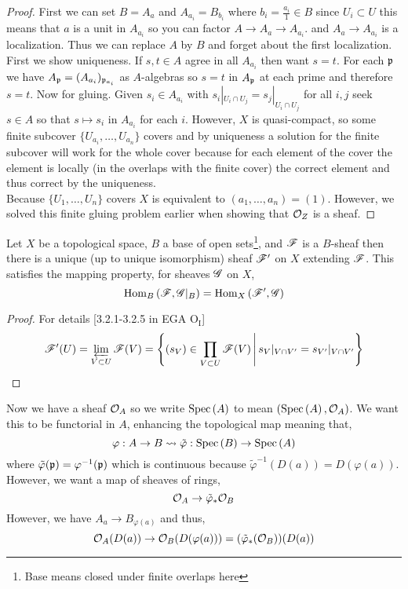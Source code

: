 \documentclass[12pt]{article}
\begin{document}
\begin{proof}
First we can set $B = A_a$ and $A_{a_i} = B_{b_i}$ where $b_i = \frac{a_i}{1} \in B$ since $U_i \subset U$ this means that $a$ is a unit in $A_{a_i}$ so you can factor $A \to A_a \to A_{a_i}$. and $A_a \to A_{a_i}$ is a localization. Thus we can replace $A$ by $B$ and forget about the first localization. First we show uniqueness. If $s,t \in A$ agree in all $A_{a_i}$ then want $s = t$. For each $\mathfrak{p}$ we have $A_{\mathfrak{p}} = (A_{a_i})_{\mathfrak{p}_{a_i}}$ as $A$-algebras so $s = t$ in $A_{\mathfrak{p}}$ at each prime and therefore $s = t$. Now for gluing. Given $s_i \in A_{a_i}$ with $s_i |_{U_i \cap U_j} = s_j |_{U_i \cap U_j}$ for all $i,j$ seek $s \in A$ so that $s \mapsto s_i$ in $A_{a_i}$ for each $i$. However, $X$ is quasi-compact, so some finite subcover $\{ U_{a_i}, \dots, U_{a_n} \}$ covers and by uniqueness a solution for the finite subcover will work for the whole cover because for each element of the cover the element is locally (in the overlaps with the finite cover) the correct element and thus correct by the uniqueness.
\bigskip\\
Because $\{ U_1, \dots, U_n \}$ covers $X$ is equivalent to $(a_1, \dots, a_n) = (1)$. However, we solved this finite gluing problem earlier when showing that $\mathcal{O}_{Z}$ is a sheaf. 
\end{proof}

\begin{lemma}
Let $X$ be a topological space, $B$ a base of open sets\footnote{Base means closed under finite overlaps here}, and $\mathscr{F}$ is a $B$-sheaf then there is a unique (up to unique isomorphism) sheaf $\mathscr{F}'$ on $X$ extending $\mathscr{F}$. This satisfies the mapping property, for sheaves $\mathscr{G}$ on $X$,
\[ \mathrm{Hom}_{B} \left( \mathscr{F}, \mathscr{G}|_B \right) = \mathrm{Hom}_{X} \left( \mathscr{F}', \mathscr{G} \right) \]
\end{lemma}

\begin{proof}
For details [3.2.1-3.2.5 in EGA $\mathrm{O_I}$]
\[ \mathscr{F}'(U) = \varprojlim_{V \subset U} \mathscr{F}(V) = \left\{ (s_V) \in \prod_{V \subset U} \mathscr{F}(V) \, \middle| \, s_V|_{V \cap V'} = s_{V'} |_{V \cap V'} \right\}  \]
\end{proof}

\begin{rmk}
Now we have a sheaf $\mathcal{O}_{A}$ so we write $\mathrm{Spec}\left( A \right)$ to mean $(\mathrm{Spec}\left( A \right), \mathcal{O}_{A})$. We want this to be functorial in $A$, enhancing the topological map meaning that,
\[ \varphi : A \to B \leadsto \tilde{\varphi} : \mathrm{Spec}\left( B \right) \to \mathrm{Spec}\left( A \right) \]
where $\tilde{\varphi}(\mathfrak{p}) = \varphi^{-1}(\mathfrak{p})$ which is continuous because $\tilde{\varphi}^{-1}(D(a)) = D(\varphi(a))$. However, we want a map of sheaves of rings,
\[ \mathcal{O}_{A} \to \tilde{\varphi}_* \mathcal{O}_{B} \]
However, we have $A_a \to B_{\varphi(a)}$ and thus,
\[ \mathcal{O}_{A}(D(a)) \to \mathcal{O}_{B}(D(\varphi(a))) = (\tilde{\varphi}_* (\mathcal{O}_{B}))(D(a)) \]
\end{rmk}
\end{document}
